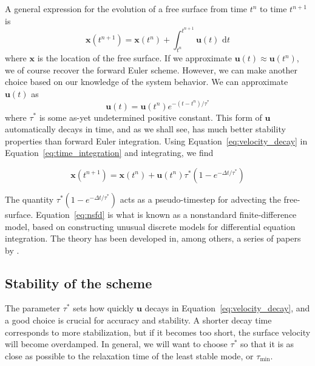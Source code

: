 \documentclass[preprint,12pt,authoryear]{elsarticle}
\begin{document}
A general expression for the evolution of a free surface from time $t^n$ to time $t^{n+1}$ is 
\begin{equation}
\mathbf{x}(t^{n+1}) = \mathbf{x}(t^n) + \int_{t^{n}}^{t^{n+1}} \mathbf{u}(t) \text{ d}t
\label{eq:time_integration}
\end{equation}
where $\mathbf{x}$ is the location of the free surface.  If we approximate $\mathbf{u}(t) \approx \mathbf{u}(t^{n})$, 
we of course recover the forward Euler scheme.
However, we can make another choice based on our knowledge of the system behavior. 
We can approximate $\mathbf{u}(t)$ as
\begin{equation}
\mathbf{u}(t) = \mathbf{u}(t^n) e^{-(t-t^n)/\tau^*}
\label{eq:velocity_decay}
\end{equation}
where $\tau^*$ is some as-yet undetermined positive constant.
This form of $\mathbf{u}$ automatically decays in time, and as we shall see, has much better 
stability properties than forward Euler integration.
Using Equation~\eqref{eq:velocity_decay} in Equation~\eqref{eq:time_integration} and integrating, we find

\begin{equation}
\mathbf{x}(t^{n+1}) = \mathbf{x}(t^n) + \mathbf{u}(t^{n}) \tau^* \left(1-e^{-\Delta t/\tau^*} \right)
\label{eq:nsfd}
\end{equation}

The quantity $\tau^*(1-e^{-\Delta t / \tau^*})$ acts as a pseudo-timestep for advecting the free-surface.
Equation~\eqref{eq:nsfd} is what is known as a nonstandard finite-difference model, based on
constructing unusual discrete models for differential equation integration.
The theory has been developed in, among others, a series of papers by
\citet{mickens1994nonstandard, mickens2002nonstandard, mickens2005dynamic}.

\subsection{Stability of the scheme}
The parameter $\tau^*$ sets how quickly $\mathbf{u}$ decays in Equation~\eqref{eq:velocity_decay}, and a good 
choice is crucial for accuracy and stability. A shorter decay time corresponds to more stabilization,
but if it becomes too short, the surface velocity will become overdamped. In general, we will want 
to choose $\tau^*$ so that it is as close as possible to the relaxation time of the least stable mode, or $\tau_{\mathrm{min}}$.
\end{document}
